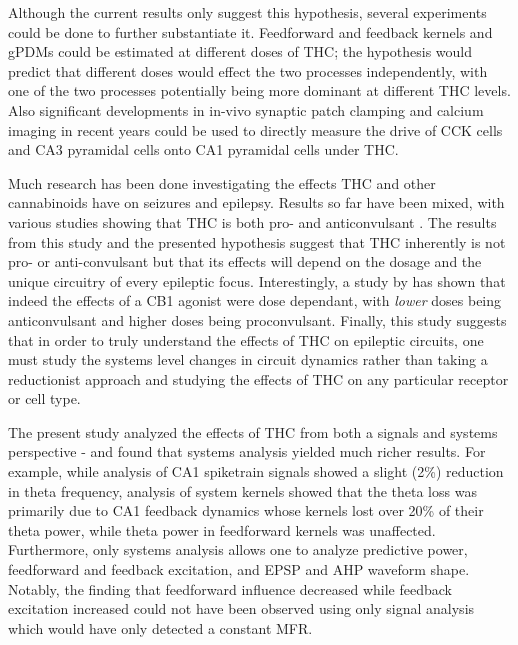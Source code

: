 \documentclass[11pt,a4paper,final]{article}
\begin{document}
Although the current results only suggest this hypothesis, several experiments could be done to further substantiate it.
Feedforward and feedback kernels and gPDMs could be estimated at different doses of THC; the hypothesis would predict that different doses would effect the two processes independently, with one of the two processes potentially being more dominant at different THC levels.
Also significant developments in in-vivo synaptic patch clamping \citep{tao15} and calcium imaging in recent years could be used to directly measure the drive of CCK cells and CA3 pyramidal cells onto CA1 pyramidal cells under THC.

Much research has been done investigating the effects THC and other cannabinoids have on seizures and epilepsy.
Results so far have been mixed, with various studies showing that THC is both pro- and anticonvulsant \citep{wallace01,blair06,deshpande07,rudenko12,katona15,hill13,katona15}.
The results from this study and the presented hypothesis suggest that THC inherently is not pro- or anti-convulsant but that its effects will depend on the dosage and the unique circuitry of every epileptic focus.
Interestingly, a study by \citet{rudenko12} has shown that indeed the effects of a CB1 agonist were dose dependant, with \textit{lower} doses being anticonvulsant and higher doses being proconvulsant.
Finally, this study suggests that in order to truly understand the effects of THC on epileptic circuits, one must study the systems level changes in circuit dynamics rather than taking a reductionist approach and studying the effects of THC on any particular receptor or cell type.

The present study analyzed the effects of THC from both a signals and systems perspective - and found that systems analysis yielded much richer results.
For example, while analysis of CA1 spiketrain signals showed a slight (2\%) reduction in theta frequency, analysis of system kernels showed that the theta loss was primarily due to CA1 feedback dynamics whose kernels lost over 20\% of their theta power, while theta power in feedforward kernels was unaffected.
Furthermore, only systems analysis allows one to analyze predictive power, feedforward and feedback excitation, and EPSP and AHP waveform shape. Notably, the finding that feedforward influence decreased while feedback excitation increased could not have been observed using only signal analysis which would have only detected a constant MFR.
\end{document}
